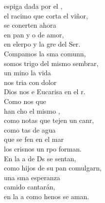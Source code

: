 \begin{cancion}%
	 espiga dada por el ,\\
	el racimo que corta el viñor,\\
	se conerten ahora\\
	en pan y o de amor,\\
	en elerpo y la gre del Ser.\\
	Compamos la sma comunn,\\
	somos trigo del mismo sembrar,\\
	un mino la vida \\
	nos tria con dolor\\
	Dios nos e Eucarisa en el r.\\
	Como nos que \\
	han cho el mismo ,\\
	como notas que tejen un canr,\\
	como tas de agua \\
	que se fen en el mar\\
	los crisnos un rpo forman.\\
	En la a de Ds se sentan,\\
	como hijos de su pan comulgarn,\\
	una sma esperanza \\
	camido cantarán,\\
	en la a como henos se aman.\\
\end{cancion}%
